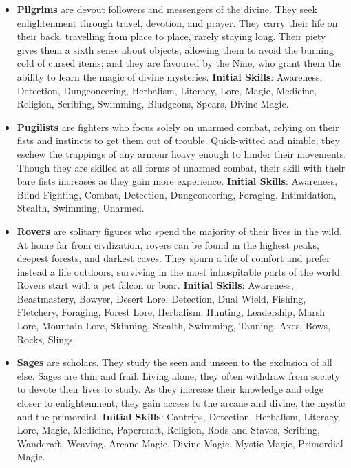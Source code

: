 \begin{itemize}
\item {\bf Pilgrims} are devout followers and messengers of the divine.  
They seek enlightenment through travel, devotion, and prayer.  They carry 
their life on their back, travelling from place to place, rarely staying 
long.  Their piety gives them a sixth sense about objects, allowing them
to avoid the burning cold of cursed items; and they are favoured by the Nine, 
who grant them the ability to learn the magic of divine mysteries.
\textbf{Initial Skills}: Awareness, Detection, Dungeoneering, Herbalism,
Literacy, Lore, Magic, Medicine, Religion, Scribing, Swimming, Bludgeons, 
Spears, Divine Magic.

\item {\bf Pugilists} are fighters who focus solely on unarmed combat, 
relying on their fists and instincts to get them out of trouble.  
Quick-witted and nimble, they eschew the trappings of any armour heavy 
enough to hinder their movements.  Though they are skilled at all forms of
unarmed combat, their skill with their bare fists increases as they gain
more experience.  \textbf{Initial Skills}: Awareness, Blind Fighting, 
Combat, Detection, Dungeoneering, Foraging, Intimidation, Stealth, 
Swimming, Unarmed.

\item {\bf Rovers} are solitary figures who spend the majority of their 
lives in the wild.  At home far from civilization, rovers can be found in 
the highest peaks, deepest forests, and darkest caves.  They spurn a life 
of comfort and prefer instead a life outdoors, surviving in the most 
inhospitable parts of the world.  Rovers start with a pet falcon or boar.
\textbf{Initial Skills}: Awareness, Beastmastery, Bowyer, Desert Lore, 
Detection, Dual Wield, Fishing, Fletchery, Foraging, Forest Lore, Herbalism, 
Hunting, Leadership, Marsh Lore, Mountain Lore, Skinning, Stealth, Swimming, 
Tanning, Axes, Bows, Rocks, Slings.

\item {\bf Sages} are scholars.  They study the seen and unseen to the 
exclusion of all else.  Sages are thin and frail.  Living alone, they often
withdraw from society to devote their lives to study.  As they increase 
their knowledge and edge closer to enlightenment, they gain access to the 
arcane and divine, the mystic and the primordial.  \textbf{Initial Skills}:
Cantrips, Detection, Herbalism, Literacy, Lore, Magic, Medicine, Papercraft,
Religion, Rods and Staves, Scribing, Wandcraft, Weaving, Arcane Magic, 
Divine Magic, Mystic Magic, Primordial Magic.


\end{itemize}
